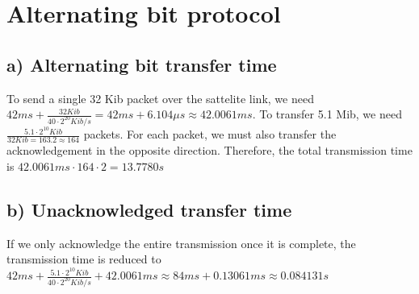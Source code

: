 \documentclass[a4paper, 11 pt, article, accentcolor=tud7b]{tudreport}
\begin{document}
	\section{Alternating bit protocol}
	
	\subsection*{a) Alternating bit transfer time}
	
	To send a single 32 Kib packet over the sattelite link, we need $42ms + \frac{32 Kib}{40 \cdot 2^{20} Kib/s} = 42ms + 6.104\mu s \approx 42.0061 ms$. To transfer 5.1 Mib, we need $\frac{5.1 \cdot 2^{10} Kib}{32 Kib = 163.2 \approx 164}$ packets. For each packet, we must also transfer the acknowledgement in the opposite direction. Therefore, the total transmission time is $42.0061ms \cdot 164 \cdot 2 = 13.7780s$
	
	\subsection*{b) Unacknowledged transfer time}
	If we only acknowledge the entire transmission once it is complete, the transmission time is reduced to $42ms + \frac{5.1 \cdot 2^{10} Kib}{40 \cdot 2^{20} Kib/s} + 42.0061ms \approx 84ms + 0.13061ms \approx 0.084131s$
\end{document}
